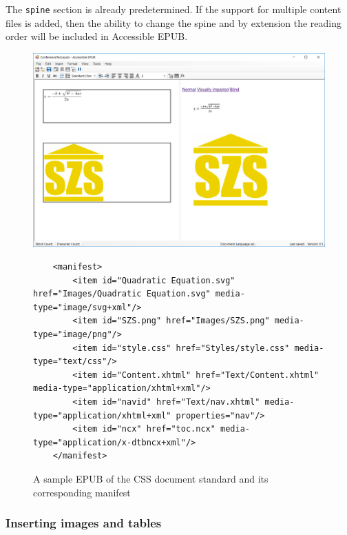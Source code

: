 The \lstinline|spine| section is already predetermined. If the support for multiple content files is added, then the ability to change the spine and by extension the reading order will be included in Accessible EPUB.

\begin{figure}[h]
	\includegraphics[width=\linewidth]{figures/AccessibleEPUBmathSZSvi.png}
	\begin{lstlisting}
	<manifest>
		<item id="Quadratic Equation.svg" href="Images/Quadratic Equation.svg" media-type="image/svg+xml"/>
		<item id="SZS.png" href="Images/SZS.png" media-type="image/png"/>
		<item id="style.css" href="Styles/style.css" media-type="text/css"/>
		<item id="Content.xhtml" href="Text/Content.xhtml" media-type="application/xhtml+xml"/>
		<item id="navid" href="Text/nav.xhtml" media-type="application/xhtml+xml" properties="nav"/>
		<item id="ncx" href="toc.ncx" media-type="application/x-dtbncx+xml"/>
	</manifest>
	\end{lstlisting}
	\caption{A sample EPUB of the CSS document standard and its corresponding manifest}	
	\label{fig:manifestExample}
\end{figure}

\subsubsection{Inserting images and tables}

